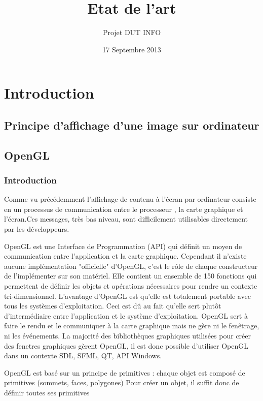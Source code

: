 \documentclass{report}
\title{Etat de l'art}
\author{Projet DUT INFO}
\date{17 Septembre 2013}
\begin{document}
\maketitle
\tableofcontents

\part{Introduction}

\chapter{Principe d'affichage d'une image sur ordinateur}


\chapter{OpenGL}

\section{Introduction}
Comme vu précédemment l'affichage de contenu à l'écran par ordinateur consiste en un processus de communication entre le processeur , la carte graphique et l'écran.Ces messages, très bas niveau, sont difficilement utilisables directement par les développeurs.

OpenGL est une Interface de Programmation (API) qui définit un moyen de communication entre l'application et la carte graphique.
Cependant il n'existe aucune implémentation "officielle" d'OpenGL, c'est le rôle de chaque constructeur de l'implémenter sur son matériel.  
Elle contient un ensemble de 150 fonctions qui permettent de définir les objets et opérations nécessaires pour rendre un contexte tri-dimensionnel.
L’avantage d'OpenGL est qu’elle est totalement portable avec tous les systèmes d'exploitation. Ceci est dû au fait qu'elle sert plutôt d'intermédiaire entre l'application et le système d'exploitation. OpenGL sert à faire le rendu et le communiquer à la carte graphique mais ne gère ni le fenêtrage, ni les événements. 
La majorité des bibliothèques graphiques utilisées pour créer des fenetres graphiques gèrent OpenGL, il est donc possible d'utiliser OpenGL dans un contexte SDL, SFML, QT, API Windows.


OpenGL est basé sur un principe de primitives : chaque objet est composé de primitives (sommets, faces, polygones) Pour créer un objet, il suffit donc de définir toutes ses primitives
\end{document}
